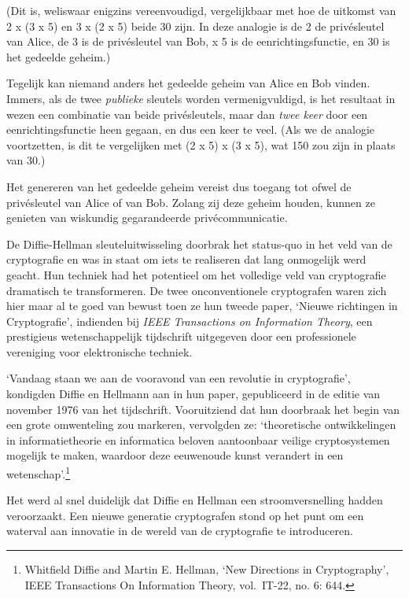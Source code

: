 \documentclass[smalldemyvopaper,11pt,twoside,onecolumn,openright,extrafontsizes,hidelinks]{memoir}
\begin{document}
(Dit is, weliswaar enigzins vereenvoudigd, vergelijkbaar met hoe de
uitkomst van 2 x (3 x 5) en 3 x (2 x 5) beide 30 zijn. In deze analogie
is de 2 de privésleutel van Alice, de 3 is de privésleutel van Bob, x 5
is de eenrichtingsfunctie, en 30 is het gedeelde geheim.)

Tegelijk kan niemand anders het gedeelde geheim van Alice en Bob vinden.
Immers, als de twee \emph{publieke} sleutels worden vermenigvuldigd, is
het resultaat in wezen een combinatie van beide privésleutels, maar dan
\emph{twee keer} door een eenrichtingsfunctie heen gegaan, en dus een
keer te veel. (Als we de analogie voortzetten, is dit te vergelijken met
(2 x 5) x (3 x 5), wat 150 zou zijn in plaats van 30.)

Het genereren van het gedeelde geheim vereist dus toegang tot ofwel de
privésleutel van Alice of van Bob. Zolang zij deze geheim houden, kunnen
ze genieten van wiskundig gegarandeerde privécommunicatie.

De Diffie-Hellman sleuteluitwisseling doorbrak het status-quo in het
veld van de cryptografie en was in staat om iets te realiseren dat lang
onmogelijk werd geacht. Hun techniek had het potentieel om het volledige
veld van cryptografie dramatisch te transformeren. De twee
onconventionele cryptografen waren zich hier maar al te goed van bewust
toen ze hun tweede paper, `Nieuwe richtingen in Cryptografie', indienden
bij \emph{IEEE Transactions on Information Theory}, een prestigieus
wetenschappelijk tijdschrift uitgegeven door een professionele
vereniging voor elektronische techniek.

`Vandaag staan we aan de vooravond van een revolutie in cryptografie',
kondigden Diffie en Hellmann aan in hun paper, gepubliceerd in de editie
van november 1976 van het tijdschrift. Vooruitziend dat hun doorbraak
het begin van een grote omwenteling zou markeren, vervolgden ze:
`theoretische ontwikkelingen in informatietheorie en informatica beloven
aantoonbaar veilige cryptosystemen mogelijk te maken, waardoor deze
eeuwenoude kunst verandert in een wetenschap'.\footnote{\hspace{0pt}Whitfield
  Diffie and Martin E. Hellman, `New Directions in Cryptography', IEEE
  Transactions On Information Theory, vol.~IT-22, no. 6: 644.}

Het werd al snel duidelijk dat Diffie en Hellman een stroomversnelling
hadden veroorzaakt. Een nieuwe generatie cryptografen stond op het punt
om een waterval aan innovatie in de wereld van de cryptografie te
introduceren.
\end{document}
